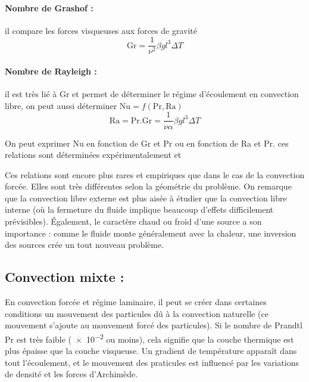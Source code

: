 \paragraph{Nombre de Grashof :}il compare les forces visqueuses aux forces de gravité
%
\begin{equation}
    \mathrm{Gr} = \frac{1}{\nu^2}\beta g l^3 \Delta T
\end{equation}

\paragraph{Nombre de Rayleigh :}il est très lié à Gr et permet de déterminer le régime d'écoulement en convection libre, on peut aussi déterminer $\mathrm{Nu} = f(\mathrm{Pr},\mathrm{Ra})$
%
\begin{equation}
    \mathrm{Ra} = \mathrm{Pr}.\mathrm{Gr}
       = \frac{1}{\nu\alpha}\beta g l^3 \Delta T
\end{equation}

On peut exprimer Nu en fonction de Gr et Pr ou en fonction de Ra et Pr. ces relations sont déterminées expérimentalement et

Ces relations sont encore plus rares et empiriques que dans le cas de la convection forcée. Elles sont très différentes selon la géométrie du problème. On remarque que la convection libre externe est plus aisée à étudier que la convection libre interne (où la fermeture du fluide implique beaucoup d'effets difficilement prévisibles). Également, le caractère chaud ou froid d'une source a son importance : comme le fluide monte généralement avec la chaleur, une inversion des sources crée un tout nouveau problème.


\subsection{Convection mixte :}

En convection forcée et régime laminaire, il peut se créer dans certaines conditions un mouvement des particules dû à la convection naturelle (ce mouvement s'ajoute au mouvement forcé des particules). Si le nombre de Prandtl Pr est très faible (\num{e-2} ou moins), cela signifie que la couche thermique est plus épaisse que la couche visqueuse. Un gradient de température apparaît dans tout l'écoulement, et le mouvement des praticules est influencé par les variations de densité et les forces d'Archimède.

